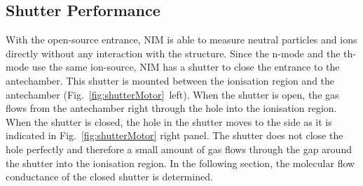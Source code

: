 	\subsection{Shutter Performance } \label{subsubsec:motorflow}
	With the open-source entrance, NIM is able to measure neutral particles and ions directly without any interaction with the structure. Since the n-mode and the th-mode use the same ion-source, NIM has a shutter to close the entrance to the antechamber. This shutter is mounted between the ionisation region and the antechamber (Fig.~\ref{fig:shutterMotor}~left). When the shutter is open, the gas flows from the antechamber right through the hole into the ionisation region. When the shutter is closed, the hole in the shutter moves to the side as it is indicated in Fig.~\ref{fig:shutterMotor} right panel. The shutter does not close the hole perfectly and therefore a small amount of gas flows through the gap around the shutter into the ionisation region. In the following section, the molecular flow conductance of the closed shutter is determined.\\
